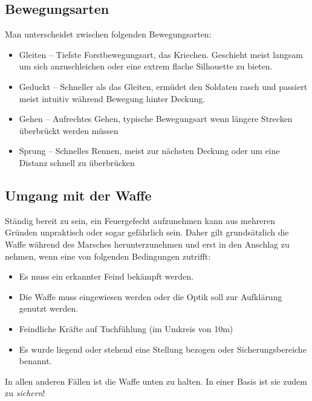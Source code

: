 \subsection{Bewegungsarten}
	Man unterscheidet zwischen folgenden Bewegungsarten:
	\begin{itemize}
		\item Gleiten -- Tiefste Forstbewegungsart, das Kriechen. Geschieht meist langsam um sich anzuschleichen oder eine extrem flache Silhouette zu bieten.
		\item Geduckt -- Schneller als das Gleiten, ermüdet den Soldaten rasch und passiert meist intuitiv während Bewegung hinter Deckung.
		\item Gehen -- Aufrechtes Gehen, typische Bewegungsart wenn längere Strecken überbrückt werden müssen
		\item Sprung -- Schnelles Rennen, meist zur nächsten Deckung oder um eine Distanz schnell zu überbrücken
	\end{itemize}

\subsection{Umgang mit der Waffe}
	Ständig bereit zu sein, ein Feuergefecht aufzunehmen kann aus mehreren Gründen unpraktisch oder sogar gefährlich sein. Daher gilt grundsätzlich die Waffe während des Marsches herunterzunehmen und erst in den Anschlag zu nehmen, wenn eine von folgenden Bedingungen zutrifft:
	\begin{itemize}
		\item Es muss ein erkannter Feind bekämpft werden.
		\item Die Waffe muss eingewiesen werden oder die Optik soll zur Aufklärung genutzt werden.
		\item Feindliche Kräfte auf Tuchfühlung (im Umkreis von 10m)
		\item Es wurde liegend oder stehend eine Stellung bezogen oder Sicherungsbereiche benannt.
	\end{itemize}

	In allen anderen Fällen ist die Waffe unten zu halten. In einer Basis ist sie zudem zu \textit{sichern}! \hfil\\
	
